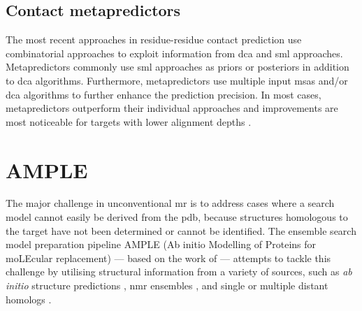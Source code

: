 \subsection{Contact metapredictors}
The most recent approaches in residue-residue contact prediction use combinatorial approaches to exploit information from \gls{dca} and \gls{sml} approaches. Metapredictors commonly use \gls{sml} approaches as priors \cite{Ovchinnikov2015-tn} or posteriors \cite{Skwark2014-qp,Jones2015-vq,Adhikari2017-kt,He2017-fn,Michel2017-pm,Wang2017-rx} in addition to \gls{dca} algorithms. Furthermore, metapredictors use multiple input \gls{msa}s and/or \gls{dca} algorithms to further enhance the prediction precision. In most cases, metapredictors outperform their individual approaches and improvements are most noticeable for targets with lower alignment depths \cite{De_Oliveira2017-gj,Wuyun2016-hh,Wang2017-rx}.

%
%

\section{AMPLE}
The major challenge in unconventional \gls{mr} is to address cases where a search model cannot easily be derived from the \gls{pdb}, because structures homologous to the target have not been determined or cannot be identified. The ensemble search model preparation pipeline AMPLE (Ab initio Modelling of Proteins for moLEcular replacement) --- based on the work of \textcite{Rigden2008-vo} --- attempts to tackle this challenge by utilising structural information from a variety of sources, such as \textit{ab initio} structure predictions \cite{Bibby2012-lm,Keegan2015-zb,Simkovic2016-wk,Thomas2015-wu,Thomas2017-sh}, \gls{nmr} ensembles \cite{Bibby2013-cp}, and single \cite{Rigden2018-zt} or multiple distant homologs \cite{Bruhn2014-aa,Hotta2014-me}. 

